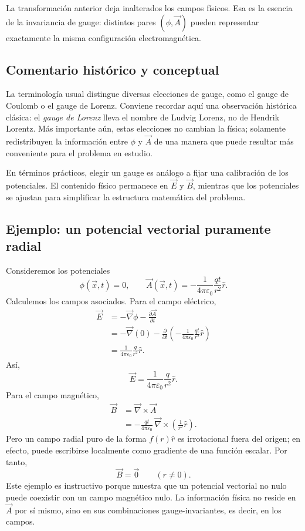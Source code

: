 \documentclass[12pt,a4paper]{article}
\theoremstyle{definition}
\theoremstyle{plain}
\numberwithin{equation}{section}
\theoremstyle{remark}
\newcommand{\E}{\vec{E}}
\newcommand{\B}{\vec{B}}
\begin{document}
La transformación anterior deja inalterados los campos físicos. Esa es la esencia de la invariancia de gauge: distintos pares $(\phi,\vec A)$ pueden representar exactamente la misma configuración electromagnética.

\subsection*{Comentario histórico y conceptual}
La terminología usual distingue diversas elecciones de gauge, como el gauge de Coulomb o el gauge de Lorenz. Conviene recordar aquí una observación histórica clásica: el \emph{gauge de Lorenz} lleva el nombre de Ludvig Lorenz, no de Hendrik Lorentz. Más importante aún, estas elecciones no cambian la física; solamente redistribuyen la información entre $\phi$ y $\vec A$ de una manera que puede resultar más conveniente para el problema en estudio.

En términos prácticos, elegir un gauge es análogo a fijar una calibración de los potenciales. El contenido físico permanece en $\E$ y $\B$, mientras que los potenciales se ajustan para simplificar la estructura matemática del problema.

\subsection*{Ejemplo: un potencial vectorial puramente radial}
Consideremos los potenciales
\begin{equation*}
    \phi(\vec x,t)=0,
    \qquad
    \vec A(\vec x,t)= -\frac{1}{4\pi\varepsilon_0}\frac{qt}{r^2}\hat r.
\end{equation*}
Calculemos los campos asociados. Para el campo eléctrico,
\begin{align*}
    \E &= -\vec\nabla\phi - \frac{\partial \vec A}{\partial t} \\
    &= -\vec\nabla(0) - \frac{\partial}{\partial t}\left(-\frac{1}{4\pi\varepsilon_0}\frac{qt}{r^2}\hat r\right) \\
    &= \frac{1}{4\pi\varepsilon_0}\frac{q}{r^2}\hat r.
\end{align*}
Así,
\begin{equation*}
    \E = \frac{1}{4\pi\varepsilon_0}\frac{q}{r^2}\hat r.
\end{equation*}
Para el campo magnético,
\begin{align*}
    \B &= \vec\nabla\times\vec A \\
    &= -\frac{qt}{4\pi\varepsilon_0}\,\vec\nabla\times\left(\frac{1}{r^2}\hat r\right).
\end{align*}
Pero un campo radial puro de la forma $f(r)\hat r$ es irrotacional fuera del origen; en efecto, puede escribirse localmente como gradiente de una función escalar. Por tanto,
\begin{equation*}
    \B = \vec 0
    \qquad (r\neq 0).
\end{equation*}
Este ejemplo es instructivo porque muestra que un potencial vectorial no nulo puede coexistir con un campo magnético nulo. La información física no reside en $\vec A$ por sí mismo, sino en sus combinaciones gauge-invariantes, es decir, en los campos.
\end{document}
